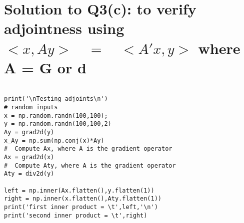 \documentclass{article}
\begin{document}
\section*{Solution to Q3(c): to verify adjointness using $<x,Ay> \quad = \quad <A'x,y>$ where A = G or d}

\begin{verbatim}

print('\nTesting adjoints\n')
# random inputs
x = np.random.randn(100,100);
y = np.random.randn(100,100,2)
Ay = grad2d(y)
x_Ay = np.sum(np.conj(x)*Ay)
#  Compute Ax, where A is the gradient operator
Ax = grad2d(x)
#  Compute Aty, where A is the gradient operator
Aty = div2d(y)

left = np.inner(Ax.flatten(),y.flatten(1))
right = np.inner(x.flatten(),Aty.flatten(1))
print('first inner product = \t',left,'\n')
print('second inner product = \t',right)

\end{verbatim}
\end{document}
